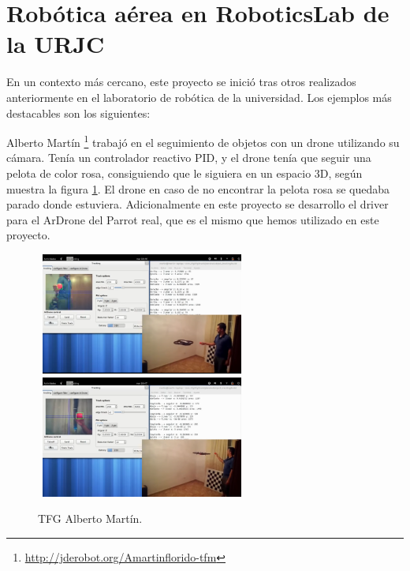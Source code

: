 \section{Rob\'otica a\'erea en RoboticsLab de la URJC}
\hspace{1 cm} En un contexto m\'as cercano, este proyecto se inici\'o tras otros realizados anteriormente en el laboratorio de rob\'otica de la universidad. Los ejemplos m\'as destacables son los siguientes:



\hspace{1 cm} Alberto Mart\'in \footnote{\url{http://jderobot.org/Amartinflorido-tfm}} \cite{MediaWikiAlbertoMartinFlorido} trabaj\'o en el seguimiento de objetos con un drone utilizando su c\'amara. Ten\'ia un controlador reactivo PID, y el drone ten\'ia que seguir una pelota de color rosa, consiguiendo que le siguiera en un espacio 3D, seg\'un muestra la figura \ref{f:AlbertoMartin}. El drone en caso de no encontrar la pelota rosa se quedaba parado donde estuviera. Adicionalmente en este proyecto se desarrollo el driver para el ArDrone del Parrot real, que es el mismo que hemos utilizado en este proyecto.
\begin{figure}[H]
 \centering
    \includegraphics[width=7cm,height=4cm]{imgs/AlbertoMartin1_1.png}
    \includegraphics[width=7cm,height=4cm]{imgs/AlbertoMartin2_1.png}
 \caption{TFG Alberto Mart\'in.}
 \label{f:AlbertoMartin}
\end{figure} 


